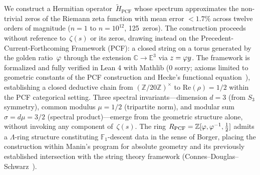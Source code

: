 We construct a Hermitian operator~$\tilde{H}_{\mathrm{PCF}}$ whose spectrum approximates the non-trivial zeros of the Riemann zeta function with mean error $<1.7\%$ across twelve orders of magnitude ($n=1$ to $n=10^{12}$, 125~zeros). The construction proceeds without reference to~$\zeta(s)$ or its zeros, drawing instead on the Precedent-Current-Forthcoming Framework (PCF): a closed string on a torus generated by the golden ratio~$\varphi$ through the extension $\mathbb{C} \to \mathbb{E}^3$ via $z = \varphi y$.
The framework is formalized and fully verified in Lean 4 with Mathlib (0 sorry; axioms limited to geometric constants of the PCF construction and Hecke's functional equation~\cite{hecke20}), establishing a closed deductive chain from $(\mathbb{Z}/20\mathbb{Z})^\times$ to $\text{Re}(\rho)=1/2$ within the PCF categorical setting.
Three spectral invariants---dimension $d=3$ (from $S_3$ symmetry), common modulus $\mu=1/2$ (tripartite norm), and modular sum $\sigma = d\mu = 3/2$ (spectral product)---emerge from the geometric structure alone, without invoking any component of~$\zeta(s)$. The ring $R_{\mathrm{PCF}} = \mathbb{Z}[\varphi,\varphi^{-1},\tfrac{1}{2}]$ admits a $\Lambda$-ring structure constituting $\mathbb{F}_1$-descent data in the sense of Borger, placing the construction within Manin's program for absolute geometry and its previously established intersection with the string theory framework (Connes--Douglas--Schwarz~\cite{connes98}).
